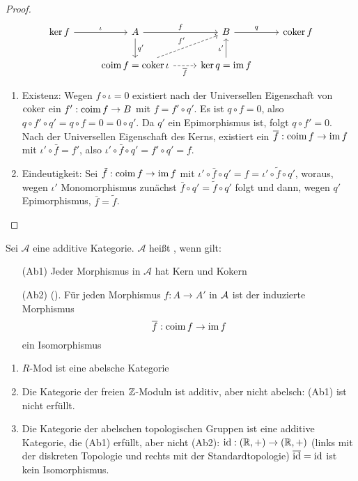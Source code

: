 \begin{proof}
	$$\begin{tikzcd}
	\ker f \arrow{r}{\iota} & A \arrow{d}{q'} \arrow{r}{f} & B \arrow{r}{q} & \coker f \\
	& \coim f = \coker \iota \arrow[dashed]{ur}{f'} \arrow[swap, dashed]{r}{\bar f} &\ker q = \im f \arrow{u}{\iota'}  & 
	\end{tikzcd}
	$$
	\begin{enumerate}
		\item Existenz: Wegen $f\circ \iota = 0$ existiert nach der Universellen Eigenschaft von $\operatorname{coker}$ ein $f': \operatorname{coim} f \to B$ mit $f= f' \circ q'$. Es ist $q \circ  f=0$, also $q \circ f' \circ q' = q \circ f = 0 = 0 \circ q'$. Da $q'$ ein Epimorphismus ist, folgt $q\circ f' = 0$. Nach der Universellen Eigenschaft des Kerns, existiert ein $\overline f: \operatorname{coim} f \to \operatorname{im} f$ mit $\iota' \circ \bar f = f'$, also $\iota' \circ \bar f \circ q' = f' \circ q' = f$.
		\item Eindeutigkeit: Sei $\tilde{f}: \operatorname{coim} f \to \operatorname{im} f$ mit $\iota' \circ \bar f\circ q' = f = \iota' \circ \tilde{f} \circ q'$, woraus, wegen $\iota'$ Monomorphismus zunächst $\bar f \circ q' = \tilde{f} \circ q'$ folgt und dann, wegen $q'$ Epimorphismus, $\bar f = \tilde{f}$.
	\end{enumerate}
\end{proof}
\begin{df}\label{5.21}
	Sei $\mathcal{A}$ eine additive Kategorie. $\mathcal{A}$ heißt , wenn gilt:
	\begin{enumerate}
		\item[(Ab1)] Jeder Morphismus in $\mathcal{A}$ hat Kern und Kokern
		\item[(Ab2)] (). Für jeden Morphismus $f:A \to A'$ in $\mathcal{A}$ ist der induzierte Morphismus 
		$$\overline f : \operatorname{coim} f \to \operatorname{im} f$$
		ein Isomorphismus 
	\end{enumerate}
\end{df}
\begin{bsp}
	\begin{enumerate}[label = \alph*)]
		\item $R$-Mod ist eine abelsche Kategorie
		\item Die Kategorie der freien $\mathbb{Z}$-Moduln ist additiv, aber nicht abelsch: (Ab1) ist nicht erfüllt.
		\item Die Kategorie der abelschen topologischen Gruppen ist eine additive Kategorie, die (Ab1) erfüllt, aber nicht (Ab2): $\operatorname{id}: (\mathbb{R}, +) \to (\mathbb{R}, +)$ (links mit der diskreten Topologie und rechts mit der Standardtopologie) $\overline{\operatorname{id}} = \operatorname{id}$ ist kein Isomorphismus.
	\end{enumerate}
\end{bsp}
